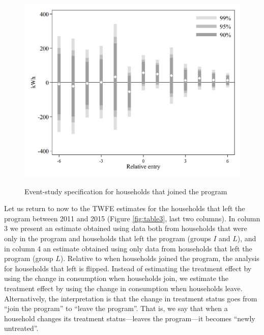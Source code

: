 \documentclass[12pt]{article}
\begin{document}
\begin{figure}[ht]
  \caption{Event-study specification for households that joined the program}\label{fig:two}
  \begin{center}
  {\includegraphics[width=1\textwidth]{./figures/image2.png}}
  \end{center}
\end{figure}

Let us return to now to the TWFE estimates for the households that left the program between 2011 and 2015 (Figure \ref{fig:table3}, last two columns). In column 3 we present an estimate obtained using data both from households that were only in the program and households that left the program (groups $I$ and  $L$), and in column 4 an estimate obtained using only data from households that left the program (group $L$). Relative to when households joined the program, the analysis for households that left is flipped. Instead of estimating the treatment effect by using the change in consumption when households join, we estimate the treatment effect by using the change in consumption when households leave. Alternatively, the interpretation is that the change in treatment status goes from \enquote{join the program} to \enquote{leave the program}. That is, we say that when a household changes its treatment status---leaves the program---it becomes \enquote{newly untreated}.
\end{document}
